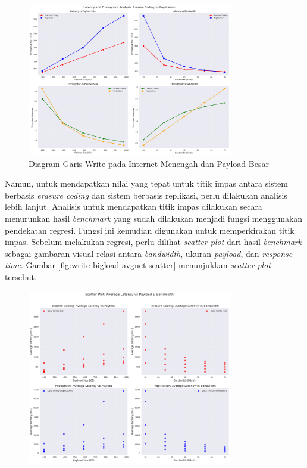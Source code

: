 \begin{enumerate}
  \begin{figure}[ht]
    \centering
    \includegraphics[width=0.8\textwidth]{resources/chapter-4/write_bigload_avgnet_line.png}

    \caption{Diagram Garis Write pada Internet Menengah dan Payload Besar}
    \label{fig:write-bigload-avgnet-line}
  \end{figure}

  
  Namun, untuk mendapatkan nilai yang tepat untuk titik impas antara sistem berbasis \textit{erasure coding} dan sistem berbasis replikasi, perlu dilakukan analisis lebih lanjut. Analisis untuk mendapatkan titik impas dilakukan secara menurunkan hasil \textit{benchmark} yang sudah dilakukan menjadi fungsi menggunakan pendekatan regresi. Fungsi ini kemudian digunakan untuk memperkirakan titik impas. Sebelum melakukan regresi, perlu dilihat \textit{scatter plot} dari hasil \textit{benchmark} sebagai gambaran visual relasi antara \textit{bandwidth}, ukuran \textit{payload}, dan \textit{response time}. Gambar \ref{fig:write-bigload-avgnet-scatter} menunjukkan \textit{scatter plot} tersebut.

  \begin{figure}[ht]
    \centering
    \includegraphics[width=0.8\textwidth]{resources/chapter-4/write_bigload_avgnet_scatterplot.png}


\end{figure}
\end{enumerate}
